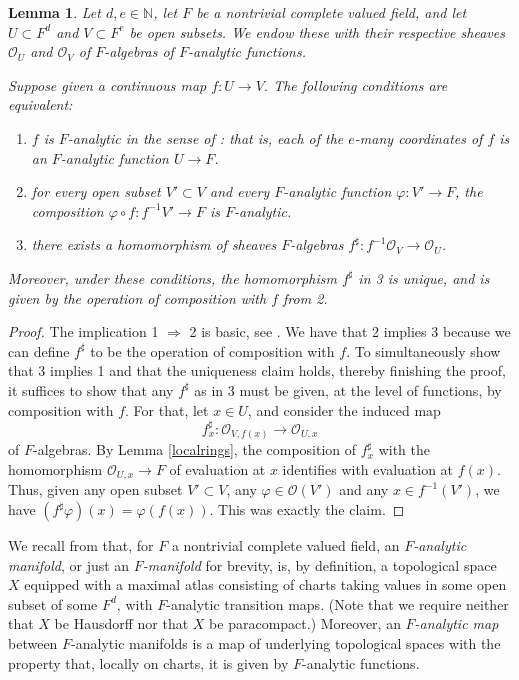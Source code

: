 \documentclass[12pt]{article}
\newtheorem{lemma}[theorem]{Lemma}
\begin{document}
\begin{lemma}\label{analyticmaps}
Let $d,e\in\mathbb{N}$, let $F$ be a nontrivial complete valued field, and let $U\subset F^d$ and $V\subset F^e$ be open subsets.  We endow these with their respective sheaves $\mathcal{O}_U$ and $\mathcal{O}_V$ of $F$-algebras of $F$-analytic functions.

Suppose given a continuous map $f:U\rightarrow V$.  The following conditions are equivalent:
\begin{enumerate}
\item $f$ is $F$-analytic in the sense of \cite{SerreLie}: that is, each of the $e$-many coordinates of $f$ is an $F$-analytic function $U\rightarrow F$.
\item for every open subset $V'\subset V$ and every $F$-analytic function $\varphi:V'\rightarrow F$, the composition $\varphi\circ f:f^{-1}V'\rightarrow F$ is $F$-analytic.
\item there exists a homomorphism of sheaves $F$-algebras $f^\sharp:f^{-1} \mathcal{O}_V\rightarrow \mathcal{O}_U$.
\end{enumerate}
Moreover, under these conditions, the homomorphism $f^\sharp$ in 3 is unique, and is given by the operation of composition with $f$ from 2.
\end{lemma}
\begin{proof}
The implication 1 $\Rightarrow$ 2 is basic, see \cite{SerreLie}.  We have that 2 implies 3 because we can define $f^\sharp$ to be the operation of composition with $f$.  To simultaneously show that 3 implies 1 and that the uniqueness claim holds, thereby finishing the proof, it suffices to show that any $f^\sharp$ as in 3 must be given, at the level of functions, by composition with $f$.  For that, let $x\in U$, and consider the induced map
$$f^\sharp_x:\mathcal{O}_{V,f(x)}\rightarrow \mathcal{O}_{U,x}$$
of $F$-algebras.  By Lemma \ref{localrings}, the composition of $f^\sharp_x$ with the homomorphism $\mathcal{O}_{U,x}\rightarrow F$ of evaluation at $x$ identifies with evaluation at $f(x)$.  Thus, given any open subset $V'\subset V$, any $\varphi\in\mathcal{O}(V')$ and any $x\in f^{-1}(V')$, we have $(f^\sharp\varphi)(x)=\varphi(f(x))$.  This was exactly the claim.
\end{proof}

We recall from \cite{SerreLie} that, for $F$ a nontrivial complete valued field, an \emph{$F$-analytic manifold}, or just an \emph{$F$-manifold} for brevity, is, by definition, a topological space $X$ equipped with a maximal atlas consisting of charts taking values in some open subset of some $F^d$, with $F$-analytic transition maps.  (Note that we require neither that $X$ be Hausdorff nor that $X$ be paracompact.)  Moreover, an \emph{$F$-analytic map} between $F$-analytic manifolds is a map of underlying topological spaces with the property that, locally on charts, it is given by $F$-analytic functions.
\end{document}
